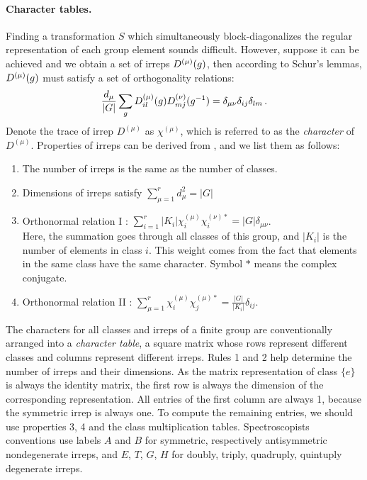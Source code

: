 \paragraph{Character tables.}
Finding a transformation $S$ which simultaneously block-diagonalizes the
regular representation of each group element sounds difficult.
However, suppose it can be achieved and we obtain a set of irreps $D^{(\mu)}(g)$,
then according to Schur's lemmas, $D^{(\mu)}(g)$ must satisfy a set of
orthogonality relations:
\begin{equation}
  \label{eq:ortho}
  \frac{d_\mu}{|G|} \sum_g D_{il}^{(\mu)}(g) D_{mj}^{(\nu)}(g^{-1}) = \delta_{\mu \nu}
  \delta_{ij} \delta_{lm}
  \,.
\end{equation}
Denote the trace of irrep $D^{(\mu)}$ as $\chi^{(\mu)}$, which is referred to as
the \emph{character} of $D^{(\mu)}$. Properties of irreps can be derived from
, and we list them as follows:
\begin{enumerate}
\item The number of irreps is the same as the number of
  classes.
\item Dimensions of irreps satisfy
  $\sum_{\mu=1}^{r} d^2_\mu = |G| $
\item Orthonormal relation I :
  $\sum_{i=1}^{r} |K_i| \chi_i^{(\mu)} \chi_i^{(\nu)*} = |G|\delta_{\mu \nu} $. \\
  Here, the summation goes through all classes of this group, and $|K_i|$ is
  the number of elements in class $i$. This weight comes from the fact that
  elements in the same class have the same character. Symbol $*$ means
  the complex conjugate.
\item Orthonormal relation II :
  $\sum_{\mu=1}^{r} \chi_i^{(\mu)} \chi_j^{(\mu)*} = \frac{|G|}{|K_i|}\delta_{ij} $. \\
\end{enumerate}
The characters for all classes and irreps of a finite group are
conventionally arranged into a \emph{character table}, a square matrix
whose rows represent different
classes and columns represent different irreps.
Rules 1 and 2 help determine the number of irreps and
their dimensions. As the matrix representation of class $\{e\}$ is always the
identity matrix, the first row is always the dimension of the
corresponding representation. All entries of the first column are always 1,
because the symmetric irrep is always one\dmn. To compute the
remaining entries, we should use properties 3, 4 and the class multiplication
tables.   Spectroscopists conventions use labels $A$ and $B$ for
symmetric, respectively antisymmetric nondegenerate irreps, and
$E$, $T$, $G$, $H$ for doubly, triply, quadruply, quintuply degenerate irreps.

